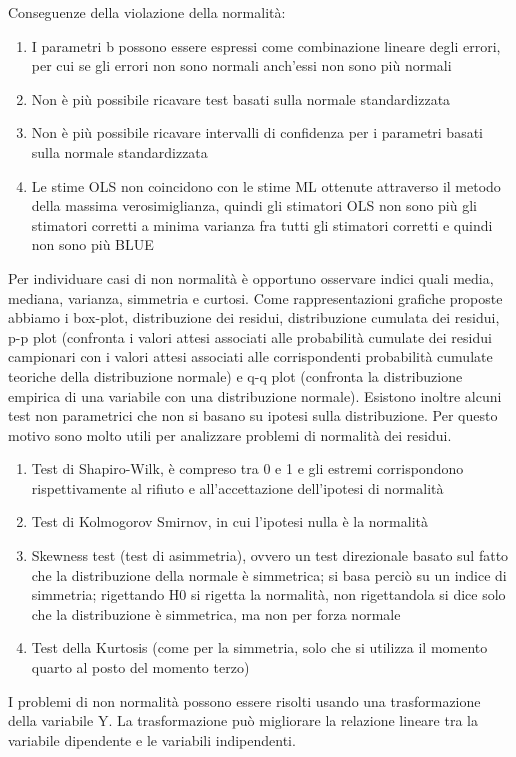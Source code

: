 \documentclass[a4page, 11pt]{article} %
\begin{document}
Conseguenze della violazione della normalità:
\begin{enumerate}[noitemsep]
\item I parametri b possono essere espressi come combinazione lineare degli errori, per cui se gli errori non sono normali anch’essi non sono più normali
\item Non è più possibile ricavare test basati sulla normale standardizzata
\item Non è più possibile ricavare intervalli di confidenza per i parametri basati sulla normale standardizzata
\item Le stime OLS non coincidono con le stime ML ottenute attraverso il metodo della massima verosimiglianza, quindi gli stimatori OLS non sono più gli stimatori corretti a minima varianza fra tutti gli stimatori corretti e quindi non sono più BLUE
\end{enumerate}
Per individuare casi di non normalità è opportuno osservare indici quali media, mediana, varianza, simmetria e curtosi. Come rappresentazioni grafiche proposte abbiamo i box-plot, distribuzione dei residui, distribuzione cumulata dei residui, p-p plot (confronta i valori attesi associati alle probabilità cumulate dei residui campionari con i valori attesi associati alle corrispondenti probabilità cumulate teoriche della distribuzione normale) e q-q plot (confronta la distribuzione empirica di una variabile con una distribuzione normale). 
Esistono inoltre alcuni test non parametrici che non si basano su ipotesi sulla distribuzione. Per questo motivo sono molto utili per analizzare problemi di normalità dei residui.
\begin{enumerate}[noitemsep]
\item Test di Shapiro-Wilk, è compreso tra 0 e 1 e gli estremi corrispondono rispettivamente al rifiuto e all’accettazione dell’ipotesi di normalità
\item Test di Kolmogorov Smirnov, in cui l’ipotesi nulla è la normalità
\item Skewness test (test di asimmetria), ovvero un test direzionale basato sul fatto che la distribuzione della normale è simmetrica; si basa perciò su un indice di simmetria; rigettando H0 si rigetta la normalità, non rigettandola si dice solo che la distribuzione è simmetrica, ma non per forza normale
\item Test della Kurtosis (come per la simmetria, solo che si utilizza il momento quarto al posto del momento terzo)
\end{enumerate}
I problemi di non normalità possono essere risolti usando una trasformazione della variabile Y. La trasformazione può migliorare la relazione lineare tra la variabile dipendente e le variabili indipendenti.
\end{document}
